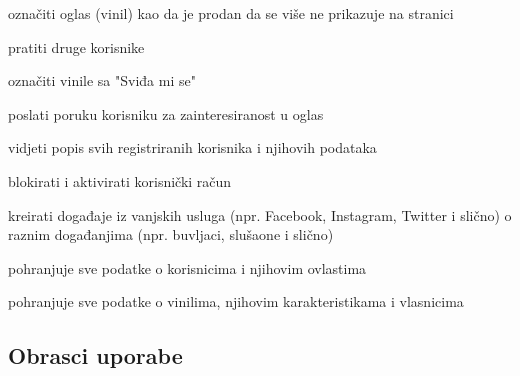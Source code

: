 \begin{packed_enum}
\begin{packed_enum}
\begin{packed_enum}
					\end{packed_enum}
					
					\item označiti oglas (vinil) kao da je prodan da se više ne prikazuje na stranici
					\item pratiti druge korisnike
					\item označiti vinile sa "Sviđa mi se"
					\item poslati poruku korisniku za zainteresiranost u oglas
							
				\end{packed_enum}
				
				\item  {}
				
					\begin{packed_enum}
					
						\item vidjeti popis svih registriranih korisnika i njihovih podataka
						\item blokirati i aktivirati korisnički račun
						\item kreirati događaje iz vanjskih usluga (npr. Facebook, Instagram, Twitter i slično) o raznim događanjima (npr. buvljaci, slušaone i slično)
						
					\end{packed_enum}
					
				\item  {}
				
					\begin{packed_enum}
					
						\item pohranjuje sve podatke o korisnicima i njihovim ovlastima
						\item pohranjuje sve podatke o vinilima, njihovim karakteristikama i vlasnicima
						
					\end{packed_enum}	
									
				
			\end{packed_enum}
			
			\eject 
			
			
				
			\subsection{Obrasci uporabe}
				
				
